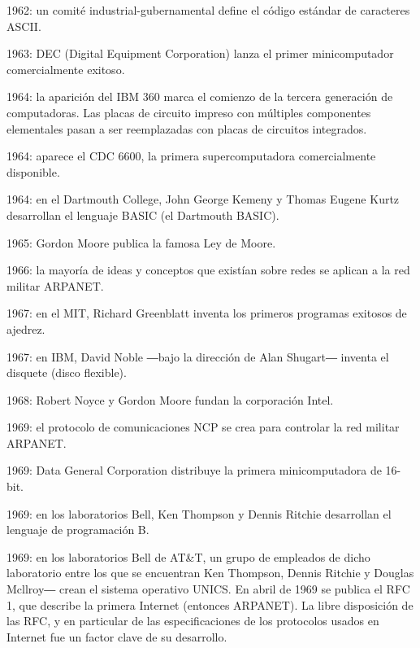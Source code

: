 \documentclass{article}
\begin{document}
{    \item  1962: un comité industrial-gubernamental define el código estándar de caracteres ASCII.
    \item  1963: DEC (Digital Equipment Corporation) lanza el primer minicomputador comercialmente exitoso.
    \item  1964: la aparición del IBM 360 marca el comienzo de la tercera generación de computadoras. Las placas de circuito impreso con múltiples componentes elementales pasan a ser reemplazadas con placas de circuitos integrados.
    \item  1964: aparece el CDC 6600, la primera supercomputadora comercialmente disponible.
    \item 1964: en el Dartmouth College, John George Kemeny y Thomas Eugene Kurtz desarrollan el lenguaje BASIC (el Dartmouth BASIC).
    \item  1965: Gordon Moore publica la famosa Ley de Moore.
    \item 1966: la mayoría de ideas y conceptos que existían sobre redes se aplican a la red militar ARPANET.
    \item 1967: en el MIT, Richard Greenblatt inventa los primeros programas exitosos de ajedrez.
    \item 1967: en IBM, David Noble ―bajo la dirección de Alan Shugart― inventa el disquete (disco flexible).
    \item 1968: Robert Noyce y Gordon Moore fundan la corporación Intel.
    \item 1969: el protocolo de comunicaciones NCP se crea para controlar la red militar ARPANET.
    \item 1969: Data General Corporation distribuye la primera minicomputadora de 16-bit.
    \item 1969: en los laboratorios Bell, Ken Thompson y Dennis Ritchie desarrollan el lenguaje de programación B.
    \item 1969: en los laboratorios Bell de AT&T, un grupo de empleados de dicho laboratorio entre los que se encuentran Ken Thompson, Dennis Ritchie y Douglas Mcllroy― crean el sistema operativo UNICS.
    En abril de 1969 se publica el RFC 1, que describe la primera Internet (entonces ARPANET). La libre disposición de las RFC, y en particular de las especificaciones de los protocolos usados en Internet fue un factor clave de su desarrollo.

}
\end{document}
